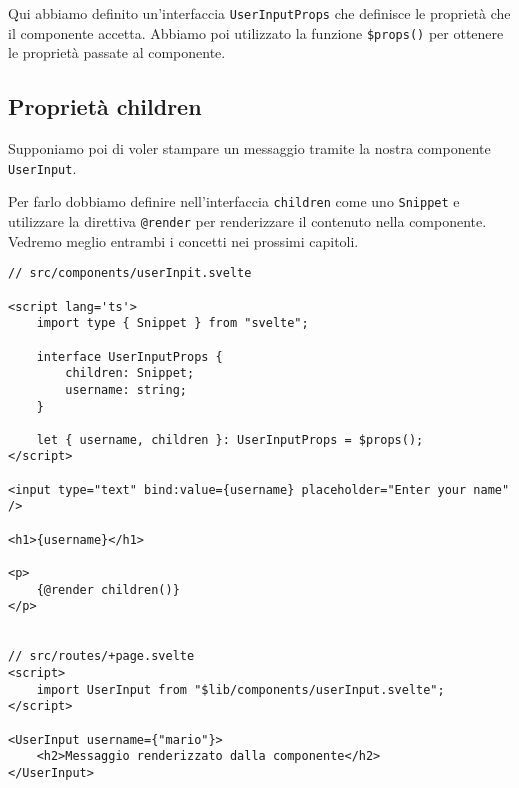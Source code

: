\documentclass[12pt]{article}
\begin{document}
Qui abbiamo definito un'interfaccia \texttt{UserInputProps} che definisce
le proprietà che il componente accetta. 
Abbiamo poi utilizzato la funzione \texttt{\$props()} per ottenere le proprietà
passate al componente.

\subsection{Proprietà children}
Supponiamo poi di voler stampare un messaggio tramite la nostra 
componente \texttt{UserInput}.

Per farlo dobbiamo definire nell'interfaccia \texttt{children}
come uno \texttt{Snippet} e utilizzare la direttiva \texttt{@render}
per renderizzare il contenuto nella componente. Vedremo meglio
entrambi i concetti nei prossimi capitoli.

\begin{verbatim}
// src/components/userInpit.svelte

<script lang='ts'>
	import type { Snippet } from "svelte";

    interface UserInputProps {
        children: Snippet;
        username: string;
    }

    let { username, children }: UserInputProps = $props();
</script>

<input type="text" bind:value={username} placeholder="Enter your name" />

<h1>{username}</h1>

<p>
    {@render children()}
</p>


// src/routes/+page.svelte
<script>
    import UserInput from "$lib/components/userInput.svelte";
</script>

<UserInput username={"mario"}>
    <h2>Messaggio renderizzato dalla componente</h2>
</UserInput>
\end{verbatim}
\end{document}
